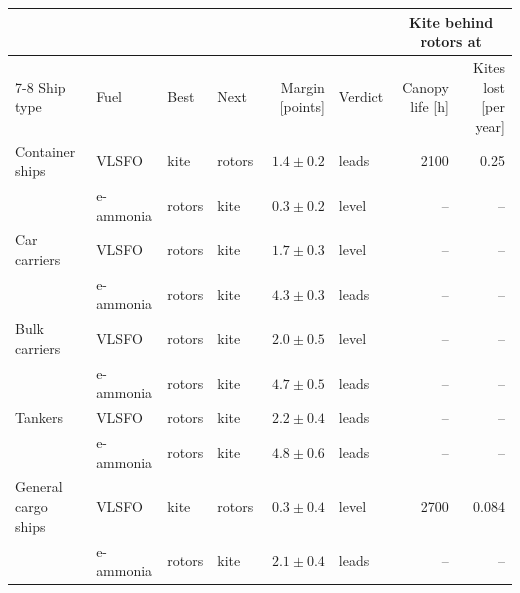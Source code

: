 \begin{tabular}{@{}llllrlrr@{}}
\toprule
 & & & & & & \multicolumn{2}{c}{Kite behind rotors at} \\
\cmidrule(l){7-8}
Ship type & Fuel & Best & Next & Margin [points] & Verdict & Canopy life [h] & Kites lost [per year] \\
\midrule
Container ships & VLSFO & kite & rotors & \(1.4 \pm 0.2\) & leads & \num{2100} & 0.25 \\
 & e-ammonia & rotors & kite & \(0.3 \pm 0.2\) & level & -- & -- \\
Car carriers & VLSFO & rotors & kite & \(1.7 \pm 0.3\) & level & -- & -- \\
 & e-ammonia & rotors & kite & \(4.3 \pm 0.3\) & leads & -- & -- \\
Bulk carriers & VLSFO & rotors & kite & \(2.0 \pm 0.5\) & level & -- & -- \\
 & e-ammonia & rotors & kite & \(4.7 \pm 0.5\) & leads & -- & -- \\
Tankers & VLSFO & rotors & kite & \(2.2 \pm 0.4\) & leads & -- & -- \\
 & e-ammonia & rotors & kite & \(4.8 \pm 0.6\) & leads & -- & -- \\
General cargo ships & VLSFO & kite & rotors & \(0.3 \pm 0.4\) & level & \num{2700} & 0.084 \\
 & e-ammonia & rotors & kite & \(2.1 \pm 0.4\) & leads & -- & -- \\
\bottomrule
\end{tabular}
